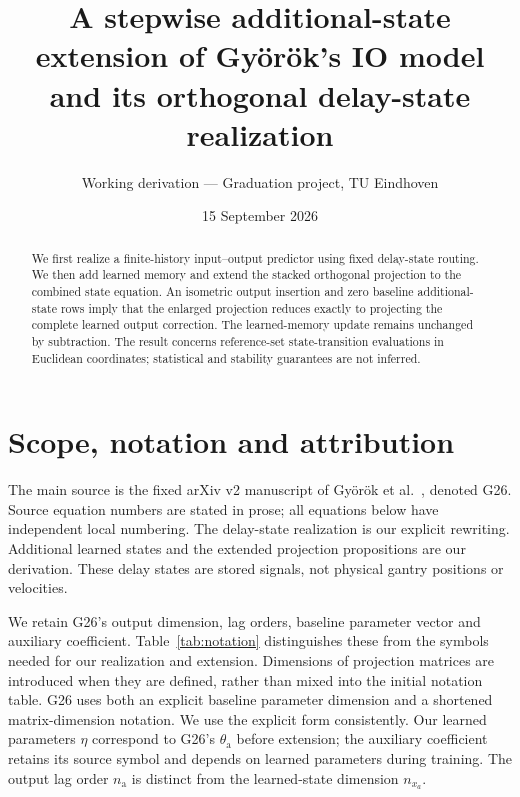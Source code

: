\documentclass[11pt,a4paper]{article}
\title{A stepwise additional-state extension of Gy\"or\"ok's IO model\\and its orthogonal delay-state realization}
\author{Working derivation --- Graduation project, TU Eindhoven}
\date{15 September 2026}
\begin{document}
\maketitle
\begin{abstract}
We first realize a finite-history input--output predictor using fixed delay-state routing. We then add learned memory and extend the stacked orthogonal projection to the combined state equation. An isometric output insertion and zero baseline additional-state rows imply that the enlarged projection reduces exactly to projecting the complete learned output correction. The learned-memory update remains unchanged by subtraction. The result concerns reference-set state-transition evaluations in Euclidean coordinates; statistical and stability guarantees are not inferred.
\end{abstract}

\section{Scope, notation and attribution}
The main source is the fixed arXiv v2 manuscript of Gy\"or\"ok et al.\ \cite{G26}, denoted G26. Source equation numbers are stated in prose; all equations below have independent local numbering. The delay-state realization is our explicit rewriting. Additional learned states and the extended projection propositions are our derivation. These delay states are stored signals, not physical gantry positions or velocities.

We retain G26's output dimension, lag orders, baseline parameter vector and auxiliary coefficient. Table~\ref{tab:notation} distinguishes these from the symbols needed for our realization and extension. Dimensions of projection matrices are introduced when they are defined, rather than mixed into the initial notation table.
G26 uses both an explicit baseline parameter dimension and a shortened matrix-dimension notation. We use the explicit form consistently. Our learned parameters \(\eta\) correspond to G26's \(\theta_{\mathrm a}\) before extension; the auxiliary coefficient retains its source symbol and depends on learned parameters during training. The output lag order \(n_{\mathrm a}\) is distinct from the learned-state dimension \(n_{x_a}\).
\end{document}
